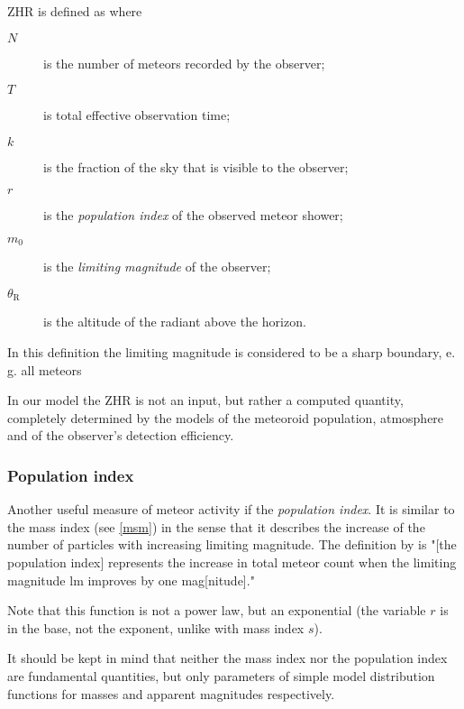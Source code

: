             ZHR is defined as
            where
            \begin{description}
                \item[$N$]
                    is the number of meteors recorded by the observer;
                \item[$T$]
                    is total effective observation time;
                \item[$k$]
                    is the fraction of the sky that is visible to the observer;
                \item[$r$]
                    is the \emph{population index} of the observed meteor shower;
                \item[$m_0$]
                    is the \emph{limiting magnitude} of the observer;
                \item[$\theta_\mathrm{R}$]
                    is the altitude of the radiant above the horizon.
            \end{description}
            In this definition the limiting magnitude is considered to be a sharp boundary, e. g. all meteors

            In our model the ZHR is not an input, but rather a computed quantity, completely determined by the
            models of the meteoroid population, atmosphere and of the observer's detection efficiency.

        \subsubsection{Population index} \label{mspr}
            Another useful measure of meteor activity if the \emph{population index}.
            It is similar to the mass index (see \cref{msm}) in the sense that it describes
            the increase of the number of particles with increasing limiting magnitude.
            The definition by \citet{molau2015} is "[the population index] represents the increase
            in total meteor count when the limiting magnitude $\mathrm{lm}$ improves by one mag[nitude]."

            Note that this function is not a power law, but an exponential (the variable $r$
            is in the base, not the exponent, unlike with mass index $s$).

            It should be kept in mind that neither the mass index nor the population index are fundamental quantities,
            but only parameters of simple model distribution functions for masses and apparent magnitudes respectively.


